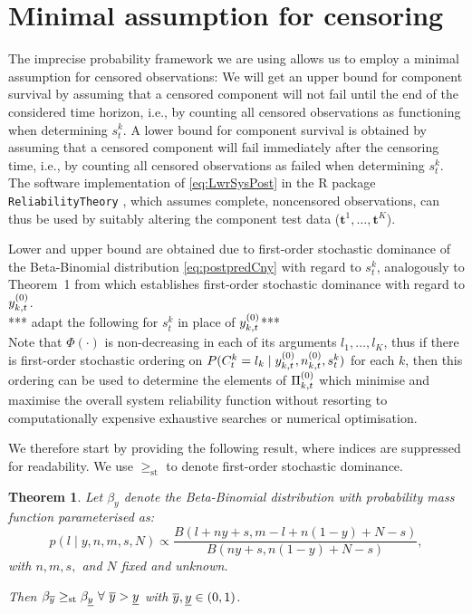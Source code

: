 \documentclass[12pt, a4paper]{elsarticle}
\newtheorem{theorem}{Theorem}
\newcommand{\bs}[1]{\boldsymbol{#1}}
\renewcommand{\vec}[1]{{\bs#1}}
\begin{document}
\section{Minimal assumption for censoring}

The imprecise probability framework we are using
allows us to employ a minimal assumption for censored observations:
We will get an upper bound for component survival by assuming that 
a censored component will not fail until the end of the considered time horizon,
i.e., by counting all censored observations as functioning when determining $s^k_t$.
A lower bound for component survival is obtained by assuming that
a censored component will fail immediately after the censoring time,
i.e., by counting all censored observations as failed when determining $s^k_t$.
The software implementation of \eqref{eq:LwrSysPost} in the \textsf{R}
\citep{R} package \texttt{ReliabilityTheory} \citep{2015:aslett-RT},
which assumes complete, noncensored observations,
can thus be used by suitably altering the component test data ($\vec{t}^1, \ldots, \vec{t}^K$).

Lower and upper bound are obtained due to first-order stochastic dominance
of the Beta-Binomial distribution \eqref{eq:postpredCny} with regard to $s^k_t$,
analogously to Theorem~1 from \citet{2016:bayessurvsignsets}
which establishes first-order stochastic dominance with regard to $y^{(0)}_{k,t}$.\\

*** adapt the following for $s^k_t$ in place of $y^{(0)}_{k,t}$***\\
Note that $\Phi(\cdot)$ is non-decreasing in each of its arguments $l_1,\ldots,l_K$,
thus if there is first-order stochastic ordering on $P(C^k_t = l_k \mid y^{(0)}_{k,t}, n^{(0)}_{k,t}, s^k_t)$
for each $k$, then this ordering can be used to determine the elements of $\Pi^{(0)}_{k,t}$
which minimise and maximise the overall system reliability function without
resorting to computationally expensive exhaustive searches or numerical optimisation.

We therefore start by providing the following result, where indices are suppressed for readability.
We use $\ge_{\mathrm{st}}$ to denote first-order stochastic dominance.

\begin{theorem}
  \label{thm:y}
  Let $\beta_y$ denote the Beta-Binomial distribution with probability mass function parameterised as:
  \[ p(l \mid y, n, m, s, N) \propto \frac{B(l + ny + s, m - l + n(1-y) + N - s)}{B(ny + s, n(1-y) + N - s)}, \]
  with $n, m, s,$ and $N$ fixed and unknown.
  
  Then $\beta_{\overline{y}} \ge_{\mathrm{st}} \beta_{\underline{y}} \ \forall \ \overline{y} > \underline{y}$ with $\overline{y}, \underline{y} \in (0,1)$.
\end{theorem}
\end{document}
